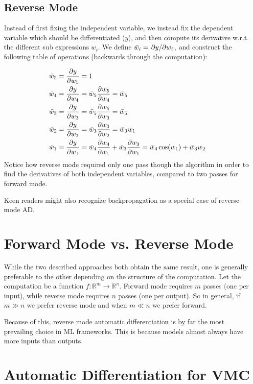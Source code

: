 \documentclass[Thesis.tex]{subfiles}
\begin{document}
\subsection{Reverse Mode}

Instead of first fixing the independent variable, we
instead fix the dependent variable which should be differentiated (\(y\)), and
then compute its derivative w.r.t. the different sub expressions $w_i$. We
define \(\bar w_i = \pdv*{y}{w_i}\), and construct the following table of
operations (backwards through the computation):

\begin{align*}
  \bar w_5 &= \pdv{y}{w_5} = 1\\
  \bar w_4 &= \pdv{y}{w_4} = \bar w_5\pdv{w_5}{w_4} = \bar w_5\\
  \bar w_3 &= \pdv{y}{w_3} = \bar w_5\pdv{w_5}{w_3} = \bar w_5\\
  \bar w_2 &= \pdv{y}{w_2} = \bar w_3\pdv{w_3}{w_2} = \bar w_3 w_1\\
  \bar w_1 &= \pdv{y}{w_1} = \bar w_4\pdv{w_4}{w_1} + \bar w_3 \pdv{w_3}{w_1}= \bar w_4 \cos(w_1) + \bar w_3w_2
\end{align*}
Notice how reverse mode required only one pass though the algorithm in order to
find the derivatives of both independent variables, compared to two passes for
forward mode.

Keen readers might also recognize backpropagation as a special case of reverse mode AD.

\section{Forward Mode vs. Reverse Mode}

While the two described approaches both obtain the same result, one is generally
preferable to the other depending on the structure of the computation. Let the
computation be a function $f: \mathbb{R}^{m}\to\mathbb{R}^n$. Forward mode
requires $m$ passes (one per input), while reverse mode requires $n$ passes (one
per output). So in general, if $m \gg n$ we prefer reverse mode and when $m\ll
n$ we prefer forward. 

Because of this, reverse mode automatic differentiation is by far the most
prevailing choice in ML frameworks. This is because models almost always have
more inputs than outputs. 

\section{Automatic Differentiation for VMC}
\end{document}
